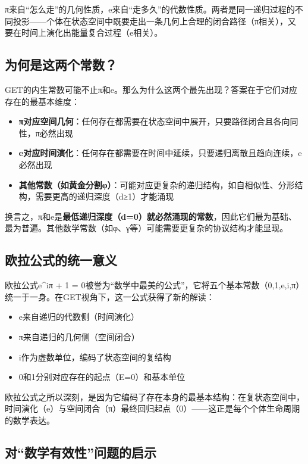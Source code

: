 \documentclass[12pt, a4paper]{article}
\begin{document}
π来自“怎么走”的几何性质，e来自“走多久”的代数性质。两者是同一递归过程的不同投影——个体在状态空间中既要走出一条几何上合理的闭合路径（π相关），又要在时间上演化出能量复合过程（e相关）。

\subsection{为何是这两个常数？}

GET的内生常数可能不止π和e。那么为什么这两个最先出现？答案在于它们对应存在的最基本维度：

\begin{itemize}
\item \textbf{π对应空间几何}：任何存在都需要在状态空间中展开，只要路径闭合且各向同性，π必然出现
\item \textbf{e对应时间演化}：任何存在都需要在时间中延续，只要递归离散且趋向连续，e必然出现
\item \textbf{其他常数（如黄金分割φ）}：可能对应更复杂的递归结构，如自相似性、分形结构，需要更高的递归深度（d≥1）才能涌现
\end{itemize}

换言之，π和e是\textbf{最低递归深度（d=0）就必然涌现的常数}，因此它们最为基础、最为普遍。其他数学常数（如φ、γ等）可能需要更复杂的协议结构才能显现。

\subsection{欧拉公式的统一意义}

欧拉公式e^{iπ} + 1 = 0被誉为“数学中最美的公式”，它将五个基本常数（0,1,e,i,π）统一于一身。在GET视角下，这一公式获得了新的解读：

\begin{itemize}
\item e来自递归的代数侧（时间演化）
\item π来自递归的几何侧（空间闭合）
\item i作为虚数单位，编码了状态空间的复结构
\item 0和1分别对应存在的起点（E=0）和基本单位
\end{itemize}

欧拉公式之所以深刻，是因为它编码了存在本身的最基本结构：在复状态空间中，时间演化（e）与空间闭合（π）最终回归起点（0）——这正是每个个体生命周期的数学表达。

\subsection{对“数学有效性”问题的启示}
\end{document}
